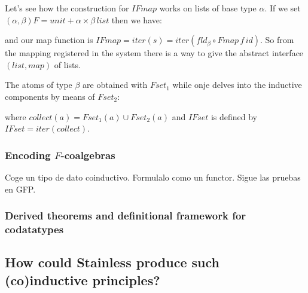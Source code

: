 \begin{example}
	Let's see how the construction for $IFmap$ works on lists of base type $\alpha$. If we set $(\alpha,\beta)F = unit + \alpha \times \beta \, list$ then we have:



and our map function is $IFmap = iter(s) = iter(fld_{\beta} \circ Fmap \, f \, id)$. So from the mapping registered in the system there is a way to give the abstract interface $(list,map)$ of lists. 

The atoms of type $\beta$ are obtained with $Fset_1$ while onje delves into the inductive components by means of $Fset_2$:


where $collect(a) = Fset_1(a) \cup Fset_2(a)$ and $IFset$ is defined by $IFset = iter(collect)$. 
\end{example}


\subsubsection{Encoding $F$-coalgebras}

Coge un tipo de dato coinductivo.
Formulalo como un functor.
Sigue las pruebas en GFP.

\subsubsection{Derived theorems and definitional framework for codatatypes}


\subsection{How could Stainless produce such (co)inductive principles?}

